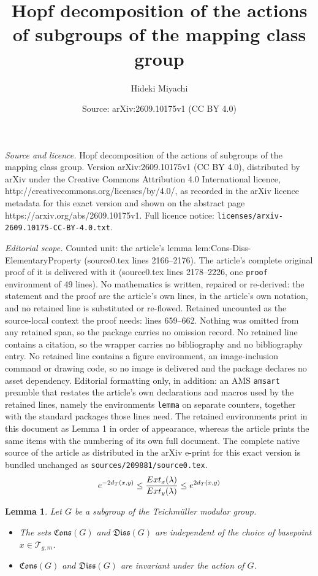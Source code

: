 \documentclass[10pt,a4paper]{amsart}
\title{Hopf decomposition of the actions of subgroups of the mapping class group}
\author{Hideki Miyachi}
\date{Source: arXiv:2609.10175v1 (CC BY 4.0)}
\newtheorem{lemma}{Lemma}
\newcommand{\conservativepart}{\mathfrak{Cons}}
\newcommand{\dissipativepart}{\mathfrak{Diss}}
\newcommand{\ext}{{\rm Ext}}
\newcommand{\teich}{\mathcal{T}}
\begin{document}
\maketitle

\noindent\emph{Source and licence.} Hopf decomposition of the actions of subgroups of the mapping class group. Version arXiv:2609.10175v1 (CC BY 4.0), distributed by arXiv under the Creative Commons Attribution 4.0 International licence, http://creativecommons.org/licenses/by/4.0/, as recorded in the arXiv licence metadata for this exact version and shown on the abstract page https://arxiv.org/abs/2609.10175v1. Full licence notice: \texttt{licenses/arxiv-2609.10175-CC-BY-4.0.txt}.\par\smallskip

\noindent\textit{Editorial scope.} Counted unit: the article's lemma lem:Cons-Diss-ElementaryProperty (source0.tex lines 2166--2176). The article's complete original proof of it is delivered with it (source0.tex lines 2178--2226, one \texttt{proof} environment of 49 lines). No mathematics is written, repaired or re-derived: the statement and the proof are the article's own lines, in the article's own notation, and no retained line is substituted or re-flowed.  Retained uncounted as the source-local context the proof needs: lines 659--662.  Nothing was omitted from any retained span, so the package carries no omission record.  No retained line contains a citation, so the wrapper carries no bibliography and no bibliography entry.  No retained line contains a figure environment, an image-inclusion command or drawing code, so no image is delivered and the package declares no asset dependency.  Editorial formatting only, in addition: an AMS \texttt{amsart} preamble that restates the article's own declarations and macros used by the retained lines, namely the environments \texttt{lemma} on separate counters, together with the standard packages those lines need.  The retained environments print in this document as Lemma 1 in order of appearance, whereas the article prints the same items with the numbering of its own full document.  The complete native source of the article as distributed in the arXiv e-print for this exact version is bundled unchanged as \texttt{sources/209881/source0.tex}.
\begin{equation}
\label{eq:QC-inv_extremal_length}
e^{-2d_T(x,y)}\le \frac{\ext_x(\lambda)}{\ext_y(\lambda)}\le e^{2d_T(x,y)}
\end{equation}

\begin{lemma}
\label{lem:Cons-Diss-ElementaryProperty}
Let $G$ be a subgroup of the Teichm\"uller modular group.
\begin{itemize}
\item[(a)]
The sets $\conservativepart(G)$ and $\dissipativepart(G)$ are independent of the choice of basepoint $x\in \teich_{g,m}$.
\item[(b)]
$\conservativepart(G)$ and $\dissipativepart(G)$ are invariant under
the action of $G$.
\end{itemize}
\end{lemma}
\end{document}
